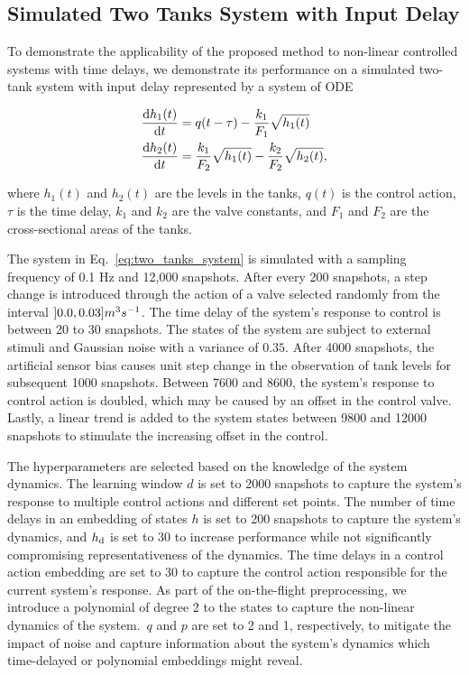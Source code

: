 \subsection{Simulated Two Tanks System with Input Delay}
To demonstrate the applicability of the proposed method to non-linear controlled systems with time delays, we demonstrate its performance on a simulated two-tank system with input delay represented by a system of ODE

\begin{equation}\label{eq:two_tanks_system}
	\begin{aligned}
		\diff{h_1(t)}{t} & = q(t-\tau) - \frac{k_1}{F_1}\sqrt{h_1(t)}                     \\
		\diff{h_2(t)}{t} & = \frac{k_1}{F_2}\sqrt{h_1(t)} - \frac{k_2}{F_2}\sqrt{h_2(t)},
	\end{aligned}
\end{equation}

where \(h_1(t)\) and \(h_2(t)\) are the levels in the tanks, \(q(t)\) is the control action, \(\tau \) is the time delay, \(k_1\) and \(k_2\) are the valve constants, and \(F_1\) and \(F_2\) are the cross-sectional areas of the tanks.

The system in Eq.~\ref{eq:two_tanks_system} is simulated with a sampling frequency of 0.1 Hz and 12,000 snapshots. After every 200 snapshots, a step change is introduced through the action of a valve selected randomly from the interval \(\interval[open left]{0.0}{0.03} m^3s^{-1}\). The time delay of the system's response to control is between 20 to 30 snapshots. The states of the system are subject to external stimuli and Gaussian noise with a variance of \(0.35\). After 4000 snapshots, the artificial sensor bias causes unit step change in the observation of tank levels for subsequent 1000 snapshots. Between 7600 and 8600, the system's response to control action is doubled, which may be caused by an offset in the control valve. Lastly, a linear trend is added to the system states between 9800 and 12000 snapshots to stimulate the increasing offset in the control.

The hyperparameters are selected based on the knowledge of the system dynamics. The learning window \(d\) is set to 2000 snapshots to capture the system's response to multiple control actions and different set points. The number of time delays in an embedding of states \(h\) is set to 200 snapshots to capture the system's dynamics, and \(h _{\text{d}}\) is set to 30 to increase performance while not significantly compromising representativeness of the dynamics. The time delays in a control action embedding are set to 30 to capture the control action responsible for the current system's response. As part of the on-the-flight preprocessing, we introduce a polynomial of degree 2 to the states to capture the non-linear dynamics of the system.~\(q\) and \(p\) are set to 2 and 1, respectively, to mitigate the impact of noise and capture information about the system's dynamics which time-delayed or polynomial embeddings might reveal.


